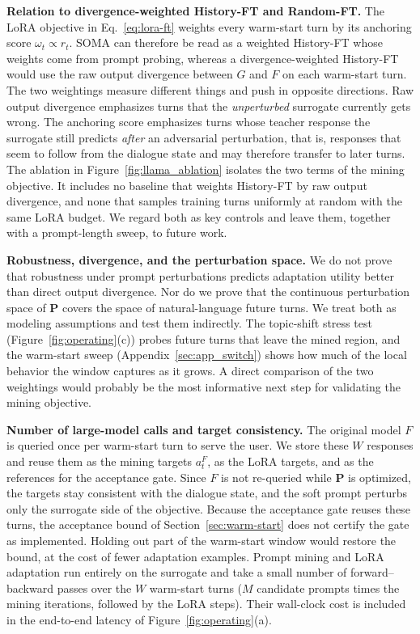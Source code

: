 {\textbf{Relation to divergence-weighted History-FT and Random-FT.}
The LoRA objective in Eq.~\ref{eq:lora-ft} weights every warm-start turn by its anchoring score $\omega_t\propto r_t$. SOMA can therefore be read as a weighted History-FT whose weights come from prompt probing, whereas a divergence-weighted History-FT would use the raw output divergence between $G$ and $F$ on each warm-start turn. The two weightings measure different things and push in opposite directions. Raw output divergence emphasizes turns that the \emph{unperturbed} surrogate currently gets wrong. The anchoring score emphasizes turns whose teacher response the surrogate still predicts \emph{after} an adversarial perturbation, that is, responses that seem to follow from the dialogue state and may therefore transfer to later turns. The ablation in Figure~\ref{fig:llama_ablation} isolates the two terms of the mining objective. It includes no baseline that weights History-FT by raw output divergence, and none that samples training turns uniformly at random with the same LoRA budget. We regard both as key controls and leave them, together with a prompt-length sweep, to future work.

\textbf{Robustness, divergence, and the perturbation space.}
We do not prove that robustness under prompt perturbations predicts adaptation utility better than direct output divergence. Nor do we prove that the continuous perturbation space of $\mathbf P$ covers the space of natural-language future turns. We treat both as modeling assumptions and test them indirectly. The topic-shift stress test (Figure~\ref{fig:operating}(c)) probes future turns that leave the mined region, and the warm-start sweep (Appendix~\ref{sec:app_switch}) shows how much of the local behavior the window captures as it grows. A direct comparison of the two weightings would probably be the most informative next step for validating the mining objective.

\textbf{Number of large-model calls and target consistency.}
The original model $F$ is queried once per warm-start turn to serve the user. We store these $W$ responses and reuse them as the mining targets $a_t^F$, as the LoRA targets, and as the references for the acceptance gate. Since $F$ is not re-queried while $\mathbf P$ is optimized, the targets stay consistent with the dialogue state, and the soft prompt perturbs only the surrogate side of the objective. Because the acceptance gate reuses these turns, the acceptance bound of Section~\ref{sec:warm-start} does not certify the gate as implemented. Holding out part of the warm-start window would restore the bound, at the cost of fewer adaptation examples. Prompt mining and LoRA adaptation run entirely on the surrogate and take a small number of forward--backward passes over the $W$ warm-start turns ($M$ candidate prompts times the mining iterations, followed by the LoRA steps). Their wall-clock cost is included in the end-to-end latency of Figure~\ref{fig:operating}(a).

}
